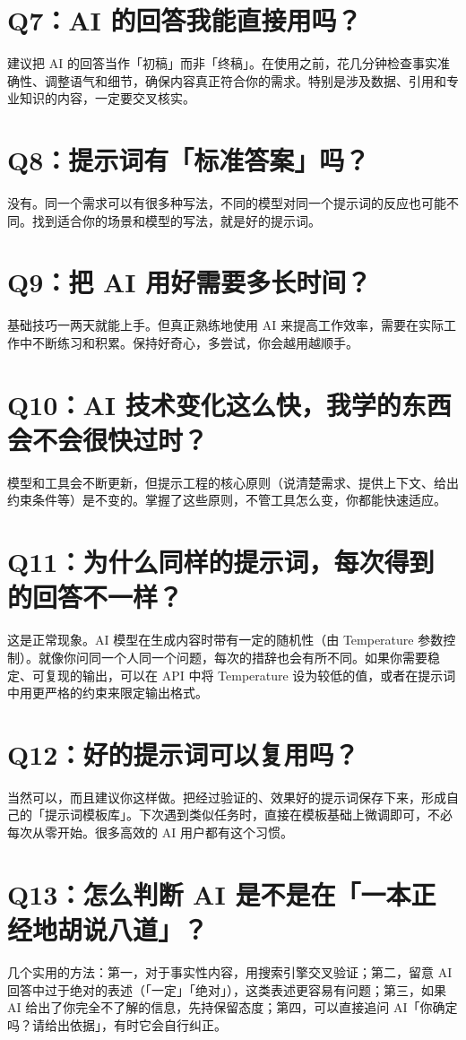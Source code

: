 \section*{Q7：AI 的回答我能直接用吗？}
建议把 AI 的回答当作「初稿」而非「终稿」。在使用之前，花几分钟检查事实准确性、调整语气和细节，确保内容真正符合你的需求。特别是涉及数据、引用和专业知识的内容，一定要交叉核实。

\section*{Q8：提示词有「标准答案」吗？}
没有。同一个需求可以有很多种写法，不同的模型对同一个提示词的反应也可能不同。找到适合你的场景和模型的写法，就是好的提示词。

\section*{Q9：把 AI 用好需要多长时间？}
基础技巧一两天就能上手。但真正熟练地使用 AI 来提高工作效率，需要在实际工作中不断练习和积累。保持好奇心，多尝试，你会越用越顺手。

\section*{Q10：AI 技术变化这么快，我学的东西会不会很快过时？}
模型和工具会不断更新，但提示工程的核心原则（说清楚需求、提供上下文、给出约束条件等）是不变的。掌握了这些原则，不管工具怎么变，你都能快速适应。

\section*{Q11：为什么同样的提示词，每次得到的回答不一样？}
这是正常现象。AI 模型在生成内容时带有一定的随机性（由 Temperature 参数控制）。就像你问同一个人同一个问题，每次的措辞也会有所不同。如果你需要稳定、可复现的输出，可以在 API 中将 Temperature 设为较低的值，或者在提示词中用更严格的约束来限定输出格式。

\section*{Q12：好的提示词可以复用吗？}
当然可以，而且建议你这样做。把经过验证的、效果好的提示词保存下来，形成自己的「提示词模板库」。下次遇到类似任务时，直接在模板基础上微调即可，不必每次从零开始。很多高效的 AI 用户都有这个习惯。

\section*{Q13：怎么判断 AI 是不是在「一本正经地胡说八道」？}
几个实用的方法：第一，对于事实性内容，用搜索引擎交叉验证；第二，留意 AI 回答中过于绝对的表述（「一定」「绝对」），这类表述更容易有问题；第三，如果 AI 给出了你完全不了解的信息，先持保留态度；第四，可以直接追问 AI「你确定吗？请给出依据」，有时它会自行纠正。


